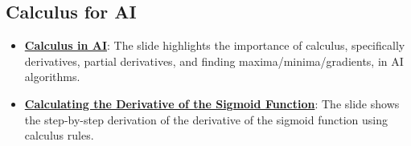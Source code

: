 \documentclass{article}%
\begin{document}
%
\subsection{Calculus for AI}%
\label{subsec:CalculusforAI}%
\begin{itemize}[leftmargin=*]%
\item \href{https://purdue.brightspace.com/d2l/common/assets/pdfjs-d2l-dist/1.0.14-legacy/web/viewer.html?file=\%2Fcontent\%2Fenforced\%2F1095467-wl.202510.CS.24300.001\%2F04L1-Linear Algebra Primer.pdf\%3Fou\%3D1095467\&lang=en-us\&container=d2l-fileviewer-rendered-pdf\&fullscreen=d2l-fileviewer-rendered-pdf-dialog\&height=667#page=19}{\textbf{Calculus in AI}}: The slide highlights the importance of calculus, specifically derivatives, partial derivatives, and finding maxima/minima/gradients, in AI algorithms.%
\item \href{https://purdue.brightspace.com/d2l/common/assets/pdfjs-d2l-dist/1.0.14-legacy/web/viewer.html?file=\%2Fcontent\%2Fenforced\%2F1095467-wl.202510.CS.24300.001\%2F04L1-Linear Algebra Primer.pdf\%3Fou\%3D1095467\&lang=en-us\&container=d2l-fileviewer-rendered-pdf\&fullscreen=d2l-fileviewer-rendered-pdf-dialog\&height=667#page=21}{\textbf{Calculating the Derivative of the Sigmoid Function}}: The slide shows the step{-}by{-}step derivation of the derivative of the sigmoid function using calculus rules.%
\end{itemize}

%
\end{document}
